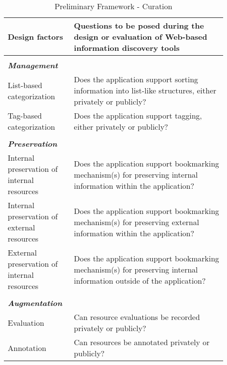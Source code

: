 \begin{table*}[htbp]
\caption{Preliminary Framework - Curation}
\centering
\label{table:old_framework_curation}
\footnotesize
\begin{tabular}{|p{0.25\linewidth}|p{0.65\linewidth}|}
\hline
\textbf{\small{Design factors}}   & \textbf{\small{Questions to be posed during the design or evaluation of Web-based information discovery tools 
}}  \\

\hline  
&\\        
\emph{\textbf{Management}}                    &                                                                                                           \\
List-based categorization               & Does the application support sorting information into list-like structures, either privately or publicly?                                                  \\
Tag-based categorization               & Does the application support tagging, either privately or publicly?                                                  \\
&\\
\emph{\textbf{Preservation}}                   &                                                                                                           \\
Internal preservation of internal resources       & Does the application support bookmarking mechanism(s) for preserving internal information within the application?        \\
Internal preservation of external resources       & Does the application support bookmarking mechanism(s) for preserving external information within the application?        \\
External preservation of internal resources      & Does the application support bookmarking mechanism(s) for preserving internal information outside of the application? \\ 
&\\
\emph{\textbf{Augmentation}}            &                                                                                                           \\
Evaluation                   & Can resource evaluations be recorded privately or publicly? \\
Annotation                   & Can resources be annotated privately or publicly?                                                                               \\    

\end{tabular}
\end{table*}
